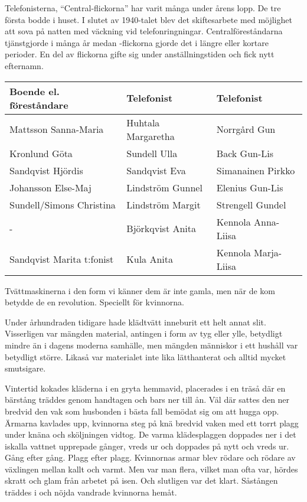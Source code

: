 Telefonisterna, ``Central-flickorna'' har varit många under årens lopp. De tre första bodde i huset. I slutet av 1940-talet blev det skiftesarbete med möjlighet att sova på natten med väckning vid telefonringningar. Centralföreståndarna tjänstgjorde i många år medan -flickorna gjorde det i längre eller kortare perioder. En del av flickorna gifte sig under anställningstiden och fick nytt efternamn.
\begin{center}
  \begin{tabular}{l l l}
    \hline
    Boende el. föreståndare & Telefonist & Telefonist\\ \hline
    Mattsson Sanna-Maria & Huhtala Margaretha & Norrgård Gun \\
    Kronlund Göta & Sundell Ulla & Back Gun-Lis \\
    Sandqvist Hjördis & Sandqvist Eva & Simanainen Pirkko \\
    Johansson Else-Maj & Lindström Gunnel & Elenius Gun-Lis \\
    Sundell/Simons Christina & Lindström Margit & Strengell Gundel \\
    - & Björkqvist Anita & Kennola Anna-Liisa \\
    Sandqvist Marita t:fonist & Kula Anita & Kennola Marja-Liisa\\ \hline
  \end{tabular}
\end{center}




Tvättmaskinerna i den form vi känner dem är inte gamla, men när de kom betydde de en revolution. Speciellt för kvinnorna.

Under århundraden tidigare hade klädtvätt inneburit ett helt annat slit. Visserligen var mängden material, antingen i form av tyg eller ylle, betydligt mindre än i dagens moderna samhälle, men mängden människor i ett hushåll var betydligt större. Likaså var materialet
inte lika lätthanterat och alltid mycket smutsigare.

Vintertid kokades kläderna  i en gryta hemmavid, placerades i en träså där en bärstång träddes genom handtagen och bars ner till ån. Väl där sattes den ner bredvid den vak som husbonden i bästa fall bemödat sig om att hugga opp. Ärmarna kavlades upp, kvinnorna steg på knä bredvid vaken med ett torrt plagg under knäna och sköljningen vidtog. De varma klädesplaggen doppades ner i det iskalla vattnet upprepade gånger, vreds ur och doppades på nytt och vreds ur. Gång efter gång. Plagg efter plagg. Kvinnornas armar blev rödare och rödare av växlingen mellan kallt och varmt. Men var man flera, vilket man ofta var, hördes skratt och glam från arbetet på isen. Och slutligen var det klart. Såstången träddes i och nöjda vandrade kvinnorna hemåt.

